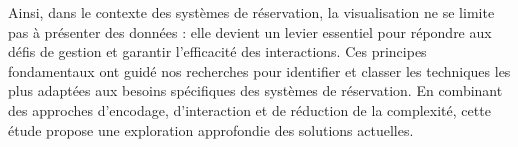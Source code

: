 \documentclass[runningheads]{llncs}
\begin{document}
Ainsi, dans le contexte des systèmes de réservation, la visualisation ne se limite pas à présenter des données : elle devient un levier essentiel pour répondre aux défis de gestion et garantir l’efficacité des interactions.
Ces principes fondamentaux ont guidé nos recherches pour identifier et classer les techniques les plus adaptées aux besoins spécifiques des systèmes de réservation. En combinant des approches d'encodage, d'interaction et de réduction de la complexité, cette étude propose une exploration approfondie des solutions actuelles.



%
%
%
% 
% 
%


\end{document}
